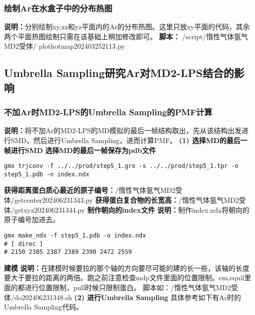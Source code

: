 \subsubsection{绘制Ar在水盒子中的分布热图}
\noindent\textbf{说明：}分别绘制xy,xz和yz平面内的Ar的分布热图。这里只放xy平面的代码，其余两个平面热图绘制只需在该基础上稍加修改即可。
\newline\textbf{脚本：} /script/惰性气体氩气MD2受体/ plothotmap202403252113.py
\subsection{Umbrella Sampling研究Ar对MD2-LPS结合的影响}
\subsubsection{不加Ar时MD2-LPS的Umbrella Sampling的PMF计算}
\noindent\textbf{说明：}将不加Ar的MD2-LPS的MD模拟的最后一帧结构取出，先从该结构出发进行SMD，然后进行Umbrella Sampling，进而计算PMF。
\newline\textbf{(1) 选择MD的最后一帧进行SMD}
\newline\textbf{选择MD的最后一帧保存为pdb文件}
\lstset{language=bash}
\begin{lstlisting}
gmx trjconv -f ../../prod/step5_1.gro -s ../../prod/step5_1.tpr -o step5_1.pdb -n index.ndx
\end{lstlisting}
\noindent\textbf{获得距离蛋白质心最近的原子编号：}/惰性气体氩气MD2受体/getcenter202406231343.py
\newline \textbf{获得蛋白复合物的长宽高：}/惰性气体氩气MD2受体/getxyz202406231344.py
\newline \textbf{制作朝向的index文件}
\newline \textbf{说明：}制作index.ndx将朝向的原子编号加进去。
\lstset{language=bash}
\begin{lstlisting}
gmx make_ndx -f step5_1.pdb -o index.ndx
# [ direc ]
# 2150 2385 2387 2389 2390 2472 2559
\end{lstlisting}
\noindent\textbf{建模}
\newline\textbf{说明：}在建模时候要拉的那个轴的方向要尽可能的建的长一些，该轴的长度要大于要拉的距离的两倍。跑之前注意检查mdp文件里面的位置限制。em,equil里面的都进行位置限制，pull时候只限制蛋白。
\newline 脚本如：/惰性气体氩气MD2受体/do202406231348.sh
\newline \textbf{(2) 进行Umbrella Sampling}
具体参考如下有Ar时的Umbrella Sampling代码。
